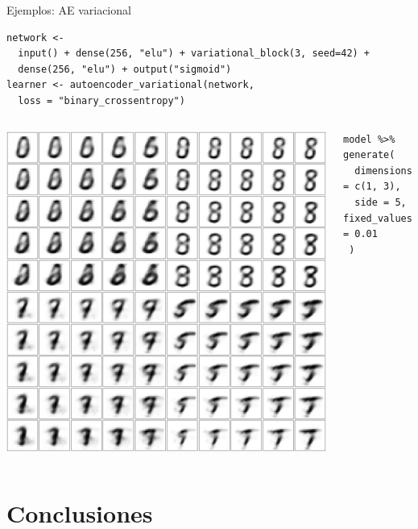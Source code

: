 \begin{frame}{Ejemplos: AE variacional}
\scriptsize
\begin{verbatim}
network <-
  input() + dense(256, "elu") + variational_block(3, seed=42) +
  dense(256, "elu") + output("sigmoid")
learner <- autoencoder_variational(network,
  loss = "binary_crossentropy")
\end{verbatim}

\begin{columns}[c]

\includegraphics[width=\columnwidth]{imgs/variational}

\begin{verbatim}
model %>% generate(
  dimensions = c(1, 3),
  side = 5, fixed_values = 0.01
 )
\end{verbatim}
\end{columns}
\normalsize

\end{frame}

\section{Conclusiones}
\subsection*{}

